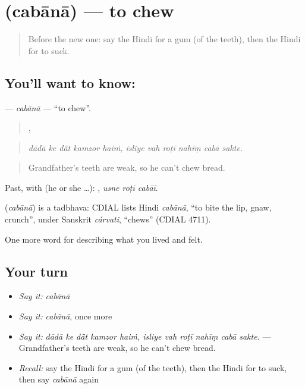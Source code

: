 \section[\texorpdfstring{\hi{चबाना} (cabānā)}{चबाना (cabānā)}]{ (cabānā) — to chew}

\label{lesson:HI-C479-cabana}



\begin{quote}
Before the new one: say the Hindi for a gum (of the teeth), then the Hindi for to suck.
\end{quote}

\subsection*{You'll want to know: }
\textbf{} — \emph{cabānā} — \textquotedblleft{}to chew\textquotedblright{}.

\begin{quote}
    ,      
\end{quote}

\begin{quote}
\emph{dādā ke dā̃t kamzor haiṁ, isliye vah roṭī nahīṃ cabā sakte.}
\end{quote}

\begin{quote}
Grandfather's teeth are weak, so he can't chew bread.
\end{quote}

Past, with  (he or she …):   , \emph{usne roṭī cabāī}.

\begin{cousinweb}
\textbf{} (\emph{cabānā}) is a tadbhava: CDIAL lists Hindi \emph{cabānā}, \textquotedblleft{}to bite the lip, gnaw, crunch\textquotedblright{}, under Sanskrit \emph{cárvati}, \textquotedblleft{}chews\textquotedblright{} (CDIAL 4711).
\end{cousinweb}

\begin{grammarlens}[title={What you've built}]
One more word for describing what you lived and felt.
\end{grammarlens}

\subsection*{Your turn}
\begin{itemize}
\raggedright
  \item \emph{Say it:} \emph{cabānā}
  \item \emph{Say it:} \emph{cabānā}, once more
  \item \emph{Say it:} \emph{dādā ke dā̃t kamzor haiṁ, isliye vah roṭī nahīṃ cabā sakte.} — Grandfather's teeth are weak, so he can't chew bread.
  \item \emph{Recall:} say the Hindi for a gum (of the teeth), then the Hindi for to suck, then say \emph{cabānā} again
\end{itemize}

